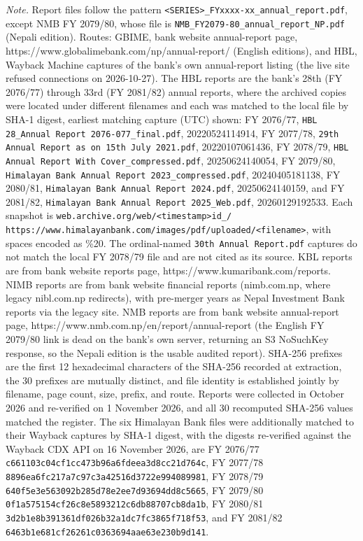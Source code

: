\vspace{4pt}
{\footnotesize\noindent
\textit{Note.} Report files follow the pattern \nolinkurl{<SERIES>_FYxxxx-xx_annual_report.pdf}, except NMB FY 2079/80, whose file is \nolinkurl{NMB_FY2079-80_annual_report_NP.pdf} (Nepali edition). Routes: GBIME, bank website annual-report page, https://www.globalimebank.com/np/annual-report/ (English editions), and HBL, Wayback Machine captures of the bank's own annual-report listing (the live site refused connections on 2026-10-27). The HBL reports are the bank's 28th (FY 2076/77) through 33rd (FY 2081/82) annual reports, where the archived copies were located under different filenames and each was matched to the local file by SHA-1 digest, earliest matching capture (UTC) shown: FY 2076/77, \nolinkurl{HBL 28_Annual Report 2076-077_final.pdf}, 20220524114914, FY 2077/78, \nolinkurl{29th Annual Report as on 15th July 2021.pdf}, 20220107061436, FY 2078/79, \nolinkurl{HBL Annual Report With Cover_compressed.pdf}, 20250624140054, FY 2079/80, \nolinkurl{Himalayan Bank Annual Report 2023_compressed.pdf}, 20240405181138, FY 2080/81, \nolinkurl{Himalayan Bank Annual Report 2024.pdf}, 20250624140159, and FY 2081/82, \nolinkurl{Himalayan Bank Annual Report 2025_Web.pdf}, 20260129192533. Each snapshot is \nolinkurl{web.archive.org/web/<timestamp>id_/} \nolinkurl{https://www.himalayanbank.com/images/pdf/uploaded/<filename>}, with spaces encoded as \%20. The ordinal-named \nolinkurl{30th Annual Report.pdf} captures do not match the local FY 2078/79 file and are not cited as its source. KBL reports are from bank website reports page, https://www.kumaribank.com/reports. NIMB reports are from bank website financial reports (nimb.com.np, where legacy nibl.com.np redirects), with pre-merger years as Nepal Investment Bank reports via the legacy site. NMB reports are from bank website annual-report page, https://www.nmb.com.np/en/report/annual-report (the English FY 2079/80 link is dead on the bank's own server, returning an S3 NoSuchKey response, so the Nepali edition is the usable audited report). SHA-256 prefixes are the first 12 hexadecimal characters of the SHA-256 recorded at extraction, the 30 prefixes are mutually distinct, and file identity is established jointly by filename, page count, size, prefix, and route. Reports were collected in October 2026 and re-verified on 1 November 2026, and all 30 recomputed SHA-256 values matched the register. The six Himalayan Bank files were additionally matched to their Wayback captures by SHA-1 digest, with the digests re-verified against the Wayback CDX API on 16 November 2026, are FY 2076/77 \nolinkurl{c661103c04cf1cc473b96a6fdeea3d8cc21d764c}, FY 2077/78 \nolinkurl{8896ea6fc217a7c97c3a42516d3722e994089981}, FY 2078/79 \nolinkurl{640f5e3e563092b285d78e2ee7d93694dd8c5665}, FY 2079/80 \nolinkurl{0f1a575154cf26c8e5893212c6db88707cb8da1b}, FY 2080/81 \nolinkurl{3d2b1e8b391361df026b32a1dc7fc3865f718f53}, and FY 2081/82 \nolinkurl{6463b1e681cf26261c0363694aae63e230b9d141}.
\par}

